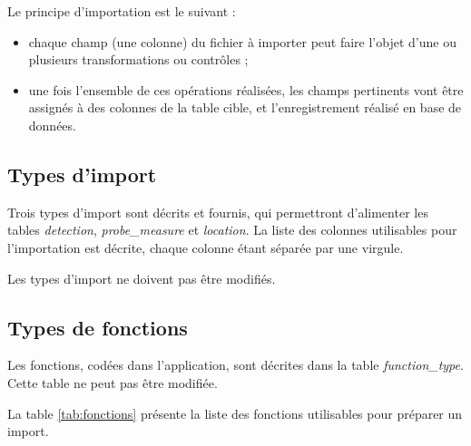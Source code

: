 Le principe d'importation est le suivant :
\begin{itemize}
	\item chaque champ (une colonne) du fichier à importer peut faire l'objet d'une ou plusieurs transformations ou contrôles ;
	\item une fois l'ensemble de ces opérations réalisées, les champs pertinents vont être assignés à des colonnes de la table cible, et l'enregistrement réalisé en base de données.
\end{itemize}

\subsection{Types d'import}

Trois types d'import sont décrits et fournis, qui permettront d'alimenter les tables \textit{detection}, \textit{probe\_measure} et \textit{location}. 
La liste des colonnes utilisables pour l'importation est décrite, chaque colonne étant séparée par une virgule.

Les types d'import ne doivent pas être modifiés.

\subsection{Types de fonctions}

Les fonctions, codées dans l'application, sont décrites dans la table \textit{function\_type}. Cette table ne peut pas être modifiée.

La table \ref{tab:fonctions} présente la liste des fonctions utilisables pour préparer un import.

